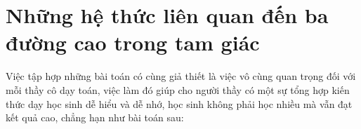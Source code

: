 \setcounter{bt}{0}
\section{Những hệ thức liên quan đến ba đường cao trong tam giác}
\begin{center}
\textbf{\color{violet}{Nguyễn Đức Huấn\\
(GV THCS Phan Bội Châu, Tứ Kỳ, Hải Dương)}}
\end{center}

\noindent Việc tập hợp những bài toán có cùng giả thiết là việc vô cùng quan trọng đối với mỗi thầy cô dạy toán, việc làm đó giúp cho người thầy có một sự tổng hợp kiến thức dạy học sinh dễ hiểu và dễ nhớ, học sinh không phải học nhiều mà vẫn đạt kết quả cao, chẳng hạn như bài toán sau:\\


